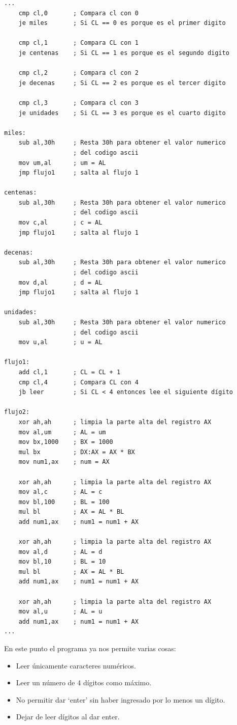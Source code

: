 \documentclass[letter,12 pt,titlepage]{article}
\begin{document}
    \begin{verbatim}
...
    cmp cl,0       ; Compara cl con 0
    je miles       ; Si CL == 0 es porque es el primer digito

    cmp cl,1       ; Compara CL con 1
    je centenas    ; Si CL == 1 es porque es el segundo digito

    cmp cl,2       ; Compara cl con 2
    je decenas     ; Si CL == 2 es porque es el tercer digito

    cmp cl,3       ; Compara cl con 3
    je unidades    ; Si CL == 3 es porque es el cuarto digito

miles:
    sub al,30h     ; Resta 30h para obtener el valor numerico 
                   ; del codigo ascii
    mov um,al      ; um = AL
    jmp flujo1     ; salta al flujo 1

centenas:
    sub al,30h     ; Resta 30h para obtener el valor numerico 
                   ; del codigo ascii
    mov c,al       ; c = AL
    jmp flujo1     ; salta al flujo 1

decenas:
    sub al,30h     ; Resta 30h para obtener el valor numerico 
                   ; del codigo ascii
    mov d,al       ; d = AL
    jmp flujo1     ; salta al flujo 1

unidades:
    sub al,30h     ; Resta 30h para obtener el valor numerico 
                   ; del codigo ascii
    mov u,al       ; u = AL

flujo1:
    add cl,1       ; CL = CL + 1
    cmp cl,4       ; Compara CL con 4
    jb leer        ; Si CL < 4 entonces lee el siguiente dígito

flujo2:
    xor ah,ah      ; limpia la parte alta del registro AX
    mov al,um      ; AL = um
    mov bx,1000    ; BX = 1000
    mul bx         ; DX:AX = AX * BX
    mov num1,ax    ; num = AX

    xor ah,ah      ; limpia la parte alta del registro AX
    mov al,c       ; AL = c
    mov bl,100     ; BL = 100
    mul bl         ; AX = AL * BL
    add num1,ax    ; num1 = num1 + AX

    xor ah,ah      ; limpia la parte alta del registro AX
    mov al,d       ; AL = d
    mov bl,10      ; BL = 10
    mul bl         ; AX = AL * BL
    add num1,ax    ; num1 = num1 + AX

    xor ah,ah      ; limpia la parte alta del registro AX
    mov al,u       ; AL = u
    add num1,ax    ; num1 = num1 + AX
...
    \end{verbatim}

    En este punto el programa ya nos permite varias cosas:
    \begin{itemize}
        \item Leer únicamente caracteres numéricos.
        \item Leer un número de 4 dígitos como máximo.
        \item No permitir dar `enter' sin haber ingresado por lo menos un dígito.
        \item Dejar de leer dígitos al dar enter.
    \end{itemize}
\end{document}
